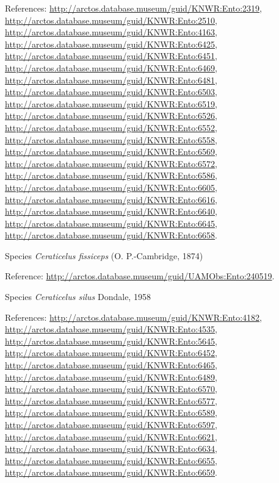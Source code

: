 \documentclass[9pt, article]{memoir}
\begin{document}
\begin{multicols}{2}
References: 
\url{http://arctos.database.museum/guid/KNWR:Ento:2319}, 
\url{http://arctos.database.museum/guid/KNWR:Ento:2510}, 
\url{http://arctos.database.museum/guid/KNWR:Ento:4163}, 
\url{http://arctos.database.museum/guid/KNWR:Ento:6425}, 
\url{http://arctos.database.museum/guid/KNWR:Ento:6451}, 
\url{http://arctos.database.museum/guid/KNWR:Ento:6469}, 
\url{http://arctos.database.museum/guid/KNWR:Ento:6481}, 
\url{http://arctos.database.museum/guid/KNWR:Ento:6503}, 
\url{http://arctos.database.museum/guid/KNWR:Ento:6519}, 
\url{http://arctos.database.museum/guid/KNWR:Ento:6526}, 
\url{http://arctos.database.museum/guid/KNWR:Ento:6552}, 
\url{http://arctos.database.museum/guid/KNWR:Ento:6558}, 
\url{http://arctos.database.museum/guid/KNWR:Ento:6569}, 
\url{http://arctos.database.museum/guid/KNWR:Ento:6572}, 
\url{http://arctos.database.museum/guid/KNWR:Ento:6586}, 
\url{http://arctos.database.museum/guid/KNWR:Ento:6605}, 
\url{http://arctos.database.museum/guid/KNWR:Ento:6616}, 
\url{http://arctos.database.museum/guid/KNWR:Ento:6640}, 
\url{http://arctos.database.museum/guid/KNWR:Ento:6645}, 
\url{http://arctos.database.museum/guid/KNWR:Ento:6658}.

\vspace{6pt}\noindent\hspace{36pt}Species \textit{Ceraticelus fissiceps} (O. P.-Cambridge, 1874)


Reference: 
\url{http://arctos.database.museum/guid/UAMObs:Ento:240519}.

\vspace{6pt}\noindent\hspace{36pt}Species \textit{Ceraticelus silus} Dondale, 1958


References: 
\url{http://arctos.database.museum/guid/KNWR:Ento:4182}, 
\url{http://arctos.database.museum/guid/KNWR:Ento:4535}, 
\url{http://arctos.database.museum/guid/KNWR:Ento:5645}, 
\url{http://arctos.database.museum/guid/KNWR:Ento:6452}, 
\url{http://arctos.database.museum/guid/KNWR:Ento:6465}, 
\url{http://arctos.database.museum/guid/KNWR:Ento:6489}, 
\url{http://arctos.database.museum/guid/KNWR:Ento:6570}, 
\url{http://arctos.database.museum/guid/KNWR:Ento:6577}, 
\url{http://arctos.database.museum/guid/KNWR:Ento:6589}, 
\url{http://arctos.database.museum/guid/KNWR:Ento:6597}, 
\url{http://arctos.database.museum/guid/KNWR:Ento:6621}, 
\url{http://arctos.database.museum/guid/KNWR:Ento:6634}, 
\url{http://arctos.database.museum/guid/KNWR:Ento:6655}, 
\url{http://arctos.database.museum/guid/KNWR:Ento:6659}.


\end{multicols}
\end{document}
